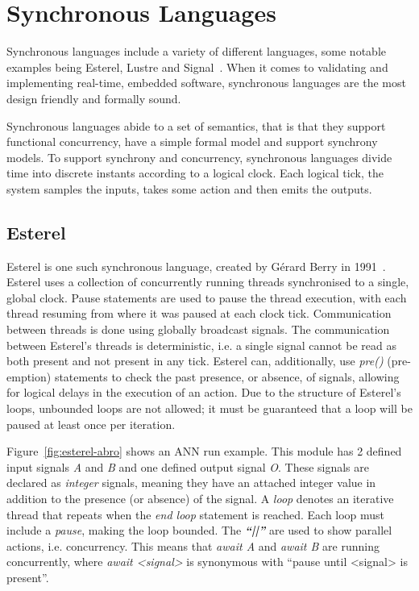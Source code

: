 \section{Synchronous Languages}
Synchronous languages include a variety of different languages, some notable examples being Esterel, Lustre and Signal~\cite{benveniste2003synchronous}.
When it comes to validating and implementing real-time, embedded software, synchronous languages are the most design friendly and formally sound.

Synchronous languages abide to a set of semantics, that is that they support functional concurrency, have a simple formal model and support synchrony models.
To support synchrony and concurrency, synchronous languages divide time into discrete instants according to a logical clock.
Each logical tick, the system samples the inputs, takes some action and then emits the outputs.

\subsection{Esterel}
Esterel is one such synchronous language, created by Gérard Berry in 1991~\cite{berry1991}. 
Esterel uses a collection of concurrently running threads synchronised to a single, global clock.
Pause statements are used to pause the thread execution, with each thread resuming from where it was paused at each clock tick.
Communication between threads is done using globally broadcast signals.
The communication between Esterel's threads is deterministic, i.e. a single signal cannot be read as both present and not present in any tick.
Esterel can, additionally, use \textit{pre()} (pre-emption) statements to check the past presence, or absence, of signals, allowing for logical delays in the execution of an action.
Due to the structure of Esterel's loops, unbounded loops are not allowed; it must be guaranteed that a loop will be paused at least once per iteration.

Figure~\ref{fig:esterel-abro} shows an \ac{ANN} run example.
This module has 2 defined input signals \textit{A} and \textit{B} and one defined output signal \textit{O}.
These signals are declared as \textit{integer} signals, meaning they have an attached integer value in addition to the presence (or absence) of the signal.
A \textit{loop} denotes an iterative thread that repeats when the \textit{end loop} statement is reached.
Each loop must include a \textit{pause}, making the loop bounded. 
The \textbf{\emph{``||''}} are used to show parallel actions, i.e. concurrency.
This means that \textit{await A} and \textit{await B} are running concurrently, where \textit{await <signal>} is synonymous with ``pause until <signal> is present''.


